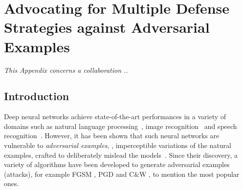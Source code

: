 \chapter{Advocating for Multiple Defense Strategies against Adversarial Examples}
\label{chapter:advocating_multiple_defense_strategies_against_adversarial_examples}
\localtableofcontents


\emph{This Appendix concerns a collaboration ..}



\section{Introduction}
\label{section:ap3-introduction}

Deep neural networks achieve state-of-the-art performances in a variety of domains such as natural language processing~\cite{radford2018Language}, image recognition~\cite{He_2016_CVPR} and speech recognition~\cite{hinton2012deep}.
However, it has been shown that such neural networks are vulnerable to \emph{adversarial examples}, \ie, imperceptible variations of the natural examples, crafted to deliberately mislead the models~\cite{globerson2006nightmare,biggio2013evasion,Szegedy2013IntriguingPO}.
Since their discovery, a variety of algorithms have been developed to generate adversarial examples (\aka attacks), for example FGSM \cite{goodfellow2014explaining}, PGD \cite{madry2018towards} and C\&W \cite{carlini2017towards}, to mention the most popular ones.

